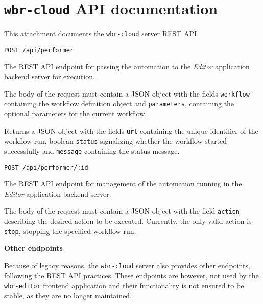 \section{\texttt{wbr-cloud} API documentation} \label{atta:cloudAPI}

This attachment documents the \texttt{wbr-cloud} server REST API.

\emptyline
\verb|POST /api/performer|
\smallskip

The REST \acs{API} endpoint for passing the automation to the \textit{Editor} application backend server for execution.

The body of the request must contain a JSON object with the fields \texttt{workflow} containing the workflow definition object and \texttt{parameters}, containing the optional parameters for the current workflow.

Returns a JSON object with the fields \texttt{url} containing the unique identifier of the workflow run, boolean \texttt{status} signalizing whether the workflow started successfully and \texttt{message} containing the status message.

\emptyline
\verb|POST /api/performer/:id|
\smallskip

The REST \acs{API} endpoint for management of the automation running in the \textit{Editor} application backend server.

The body of the request must contain a JSON object with the field \texttt{action} describing the desired action to be executed. Currently, the only valid action is \texttt{stop},
stopping the specified workflow run.

\emptyline
\textbf{Other endpoints}
\smallskip

Because of legacy reasons, the \texttt{wbr-cloud} server also provides other endpoints, following the REST API practices.
These endpoints are however, not used by the \texttt{wbr-editor} frontend application and their functionality is not ensured to be stable, as they are no longer maintained.